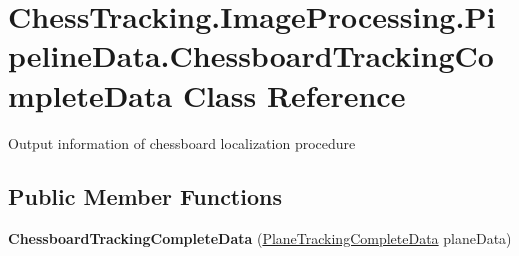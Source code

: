 \hypertarget{class_chess_tracking_1_1_image_processing_1_1_pipeline_data_1_1_chessboard_tracking_complete_data}{}\section{Chess\+Tracking.\+Image\+Processing.\+Pipeline\+Data.\+Chessboard\+Tracking\+Complete\+Data Class Reference}
\label{class_chess_tracking_1_1_image_processing_1_1_pipeline_data_1_1_chessboard_tracking_complete_data}


Output information of chessboard localization procedure  


\subsection*{Public Member Functions}
\begin{DoxyCompactItemize}
\item 
\mbox{\label{class_chess_tracking_1_1_image_processing_1_1_pipeline_data_1_1_chessboard_tracking_complete_data_a6447e135bcd34a0c41efebbaf1b79be8}} 
{\bfseries Chessboard\+Tracking\+Complete\+Data} (\mbox{\hyperlink{class_chess_tracking_1_1_image_processing_1_1_pipeline_data_1_1_plane_tracking_complete_data}{Plane\+Tracking\+Complete\+Data}} plane\+Data)
\end{DoxyCompactItemize}
